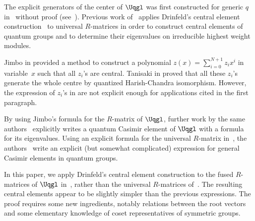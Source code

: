 The explicit generators of the center of $\Uqgl$ was first constructed for generic $q$
in~\cite{FaddeevRT} without proof (see~\cite{Arnaudon:1993yg}). Previous work of~\cite{ZGBCMP} applies Drinfeld's central element construction~\cite{Drin90} to universal $R$-matrices in order to construct central elements of quantum groups and to determine their eigenvalues on irreducible highest weight modules.

Jimbo in \cite{Jimbo1986} provided a method to construct a polynomial $z(x) = \sum_{i=0}^{N+1} z_ix^i$ in variable~$x$ such that all $z_i$’s are central. Tanisaki in \cite{Tanisaki1992KILLINGFH} proved that all these $z_i$’s generate the whole centre by quantized Harish-Chandra isomorphism. However, the expression of $z_i$’s in \cite{Jimbo1986} are not explicit enough for applications cited in the first paragraph.

By using Jimbo's \cite{Jimbo1986} formula for the $R$-matrix of $\Uqgl$, further work by the same authors~\cite{GZB} explicitly writes a quantum Casimir element of $\Uqgl$ with a formula for its eigenvalues. Using an explicit formula for the universal $R$-matrix in~\cite{KirillovResh}, the authors~\cite{ZGBJPhysA} write an explicit (but somewhat complicated) expression for general Casimir elements in quantum groups.

In this paper, we apply Drinfeld's central element construction to the fused $R$-matrices of $\Uqgl$ in~\cite{Jimbo1986}, rather than the universal $R$-matrices of~\cite{KirillovResh}. The resulting central elements appear to be slightly simpler than the previous expressions. The proof requires some new ingredients, notably relations between the root vectors~\cite{KT91,Lusztig90,Xi1994} and some elementary knowledge of coset representatives of symmetric groups.
